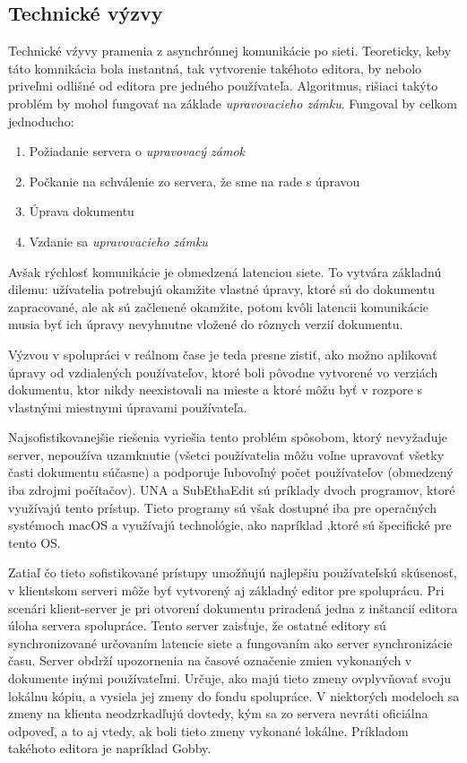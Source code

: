 \subsection{Technické výzvy}
Technické vźyvy pramenia z asynchrónnej komunikácie po sieti. Teoreticky, keby táto 
komnikácia bola instantná, tak vytvorenie takéhoto editora, by nebolo priveľmi odlišné od
editora pre jedného používateľa. Algoritmus, rišiaci takýto problém by mohol fungovať na 
základe \textit{upravovacieho zámku}. Fungoval by celkom jednoducho:
\begin{enumerate}
  \item Požiadanie servera o \textit{upravovacý zámok}
  \item Počkanie na schválenie zo servera, že sme na rade s úpravou
  \item Úprava dokumentu
  \item Vzdanie sa \textit{upravovacieho zámku}
\end{enumerate}
Avšak rýchlosť komunikácie je obmedzená latenciou siete. To vytvára základnú dilemu: 
užívatelia potrebujú okamžite vlastné úpravy, ktoré sú do dokumentu zapracované,
ale ak sú začlenené okamžite, potom kvôli latencii komunikácie musia byť ich
úpravy nevyhnutne vložené do rôznych verzií dokumentu.

Výzvou v spolupráci v reálnom čase je teda presne zistiť, ako možno aplikovať úpravy
od vzdialených používateľov, ktoré boli pôvodne vytvorené vo verziách dokumentu, ktor
nikdy neexistovali na mieste a ktoré môžu byť v rozpore s vlastnými 
miestnymi úpravami používateľa.

Najsofistikovanejšie riešenia vyriešia tento problém spôsobom, ktorý nevyžaduje server,
nepoužíva uzamknutie (všetci používatelia môžu voľne upravovať všetky časti dokumentu súčasne) 
a podporuje ľubovoľný počet používateľov (obmedzený iba zdrojmi počítačov). 
UNA a SubEthaEdit sú príklady dvoch programov, ktoré využívajú tento prístup.
Tieto programy sú však dostupné iba pre operačných systémoch macOS a využívajú technológie,
ako napríklad \cite{bonjour},ktoré sú špecifické pre tento OS.

Zatiaľ čo tieto sofistikované prístupy umožňujú najlepšiu používateľskú skúsenosť,
v klientskom serveri môže byť vytvorený aj základný editor pre spoluprácu. Pri scenári
klient-server je pri otvorení dokumentu priradená jedna z inštancií editora úloha servera
spolupráce. Tento server zaisťuje, že ostatné editory sú synchronizované určovaním
latencie siete a fungovaním ako server synchronizácie času. Server obdrží upozornenia
na časové označenie zmien vykonaných v dokumente inými používateľmi. 
Určuje, ako majú tieto zmeny ovplyvňovať svoju lokálnu kópiu, a vysiela jej zmeny do
fondu spolupráce. V niektorých modeloch sa zmeny na klienta neodzrkadľujú dovtedy,
kým sa zo servera nevráti oficiálna odpoveď, a to aj vtedy, ak boli tieto zmeny vykonané lokálne.
Príkladom takéhoto editora je napríklad Gobby.

